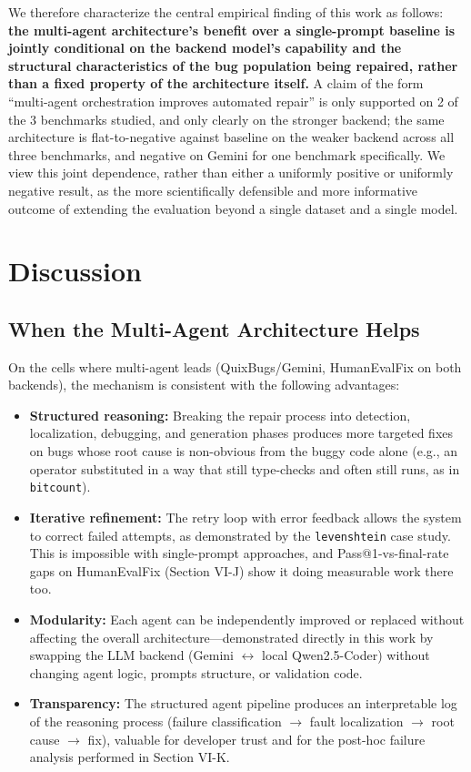 \documentclass[conference]{IEEEtran}
\begin{document}
We therefore characterize the central empirical finding of this work as follows: \textbf{the multi-agent architecture's benefit over a single-prompt baseline is jointly conditional on the backend model's capability and the structural characteristics of the bug population being repaired, rather than a fixed property of the architecture itself.} A claim of the form ``multi-agent orchestration improves automated repair'' is only supported on 2 of the 3 benchmarks studied, and only clearly on the stronger backend; the same architecture is flat-to-negative against baseline on the weaker backend across all three benchmarks, and negative on Gemini for one benchmark specifically. We view this joint dependence, rather than either a uniformly positive or uniformly negative result, as the more scientifically defensible and more informative outcome of extending the evaluation beyond a single dataset and a single model.

\section{Discussion}

\subsection{When the Multi-Agent Architecture Helps}
On the cells where multi-agent leads (QuixBugs/Gemini, HumanEvalFix on both backends), the mechanism is consistent with the following advantages:
\begin{itemize}
    \item \textbf{Structured reasoning:} Breaking the repair process into detection, localization, debugging, and generation phases produces more targeted fixes on bugs whose root cause is non-obvious from the buggy code alone (e.g., an operator substituted in a way that still type-checks and often still runs, as in \texttt{bitcount}).
    \item \textbf{Iterative refinement:} The retry loop with error feedback allows the system to correct failed attempts, as demonstrated by the \texttt{levenshtein} case study. This is impossible with single-prompt approaches, and Pass@1-vs-final-rate gaps on HumanEvalFix (Section VI-J) show it doing measurable work there too.
    \item \textbf{Modularity:} Each agent can be independently improved or replaced without affecting the overall architecture---demonstrated directly in this work by swapping the LLM backend (Gemini $\leftrightarrow$ local Qwen2.5-Coder) without changing agent logic, prompts structure, or validation code.
    \item \textbf{Transparency:} The structured agent pipeline produces an interpretable log of the reasoning process (failure classification $\rightarrow$ fault localization $\rightarrow$ root cause $\rightarrow$ fix), valuable for developer trust and for the post-hoc failure analysis performed in Section VI-K.
\end{itemize}
\end{document}
